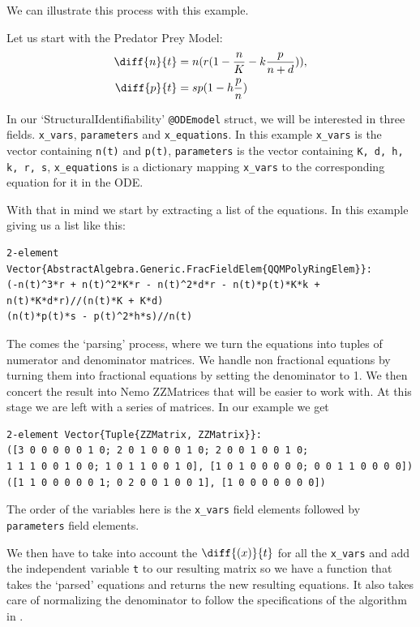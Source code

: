 \documentclass[oneside, a4paper, onecolumn, 11pt]{article}
\begin{document}
We can illustrate this process with this example.

Let us start with the Predator Prey Model:
\begin{align*}
    \diff{n}{t}
     & = n (r (1 - \frac{n}{K} - k \frac{p}{n + d})), \\
    \diff{p}{t}
     & = sp (1 - h \frac{p}{n})
\end{align*}

In our `StructuralIdentifiability' \texttt{@ODEmodel} struct, we will be interested in three fields. \texttt{x\_vars}, \texttt{parameters} and \texttt{x\_equations}. In this example \texttt{x\_vars} is the vector containing \texttt{n(t)} and \texttt{p(t)}, \texttt{parameters} is the vector containing \texttt{K, d, h, k, r, s}, \texttt{x\_equations} is a dictionary mapping \texttt{x\_vars} to the corresponding equation for it in the ODE.

With that in mind we start by extracting a list of the equations. In this example giving us a list like this:
\begin{lstlisting}
2-element Vector{AbstractAlgebra.Generic.FracFieldElem{QQMPolyRingElem}}:
(-n(t)^3*r + n(t)^2*K*r - n(t)^2*d*r - n(t)*p(t)*K*k + n(t)*K*d*r)//(n(t)*K + K*d)
(n(t)*p(t)*s - p(t)^2*h*s)//n(t)
\end{lstlisting}

The comes the `parsing' process, where we turn the equations into tuples of numerator and denominator matrices. We handle non fractional equations by turning them into fractional equations by setting the denominator to 1. We then concert the result into Nemo ZZMatrices that will be easier to work with. At this stage we are left with a series of matrices. In our example we get
\begin{lstlisting}
2-element Vector{Tuple{ZZMatrix, ZZMatrix}}:
([3 0 0 0 0 0 1 0; 2 0 1 0 0 0 1 0; 2 0 0 1 0 0 1 0;
1 1 1 0 0 1 0 0; 1 0 1 1 0 0 1 0], [1 0 1 0 0 0 0 0; 0 0 1 1 0 0 0 0])
([1 1 0 0 0 0 0 1; 0 2 0 0 1 0 0 1], [1 0 0 0 0 0 0 0])
\end{lstlisting}

The order of the variables here is the \texttt{x\_vars} field elements followed by \texttt{parameters} field elements.

We then have to take into account the \(\diff{(x)}{t}\) for all the \texttt{x\_vars} and add the independent variable \texttt{t} to our resulting matrix so we have a function that takes the `parsed' equations and returns the new resulting equations. It also takes care of normalizing the denominator to follow the specifications of the algorithm in \cite{Hubert2013}.
\end{document}
